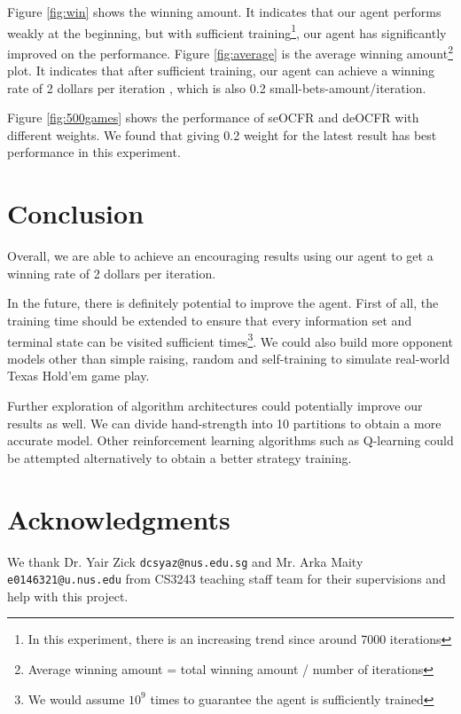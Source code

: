 \documentclass{article}
\begin{document}
Figure \ref{fig:win} shows the winning amount. It indicates that our agent performs weakly at the beginning, but with sufficient training\footnote{In this experiment, there is an increasing trend since around 7000 iterations}, our agent has significantly improved on the performance. Figure \ref{fig:average} is the average winning amount\footnote{Average winning amount = total winning amount / number of iterations} plot. It indicates that after sufficient training, our agent can achieve a winning rate of 2 dollars per iteration , which is also 0.2 small-bets-amount/iteration.  

Figure \ref{fig:500games} shows the performance of seOCFR and deOCFR with different weights. We found that giving 0.2 weight for the latest result has best performance in this experiment.

\section{Conclusion}
Overall, we are able to achieve an encouraging results using our agent to get a winning rate of 2 dollars per iteration.

In the future, there is definitely potential to improve the agent. First of all, the training time should be extended to ensure that every information set and terminal state can be visited sufficient times\footnote{We would assume $10^9$ times to guarantee the agent is sufficiently trained}. We could also build more opponent models other than simple raising, random and self-training to simulate real-world Texas Hold'em game play. 

Further exploration of algorithm architectures could potentially improve our results as well. We can divide hand-strength into 10 partitions to obtain a more accurate model. Other reinforcement learning algorithms such as Q-learning could be attempted alternatively to obtain a better strategy training.





\appendix

\section{Acknowledgments}

We thank Dr. Yair Zick \texttt{dcsyaz@nus.edu.sg} and Mr. Arka Maity \texttt{e0146321@u.nus.edu} from CS3243 teaching staff team for their supervisions and help with this project.
 


 
\end{document}
